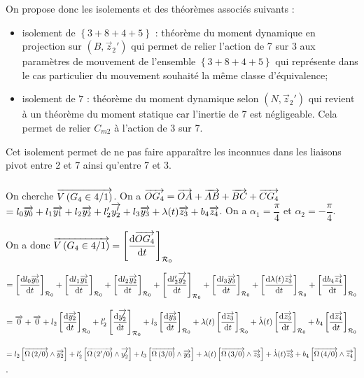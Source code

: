\documentclass[10pt,fleqn]{article} %
\begin{document}
On propose donc les isolements et des théorèmes associés suivants : 
\begin{itemize}
\item isolement de $\left\{3+8+4+5\right\}$ : théorème du moment dynamique en projection sur $\left(B,\overrightarrow{z}_2'\right)$ qui permet de relier l'action de 7 sur 3 aux paramètres de mouvement de l'ensemble $\left\{3+8+4+5\right\}$ qui représente dans le cas particulier du mouvement souhaité la même classe d'équivalence;
\item isolement de $7$ : théorème du moment dynamique selon $\left(N,\overrightarrow{z}_2'\right)$ qui revient à un théorème du moment statique car l'inertie de 7 est négligeable. Cela permet de relier $C_{m2}$ à l'action de 3 sur 7.
\end{itemize}
Cet isolement permet de ne pas faire apparaître les inconnues dans les liaisons pivot entre 2 et 7 ainsi qu'entre 7 et 3. 
\subparagraph{}%
On cherche $\overrightarrow{V\left( {G_4} \in {4}/{1}\right)}$. On a $\overrightarrow{OG_4}=\overrightarrow{OA}+\overrightarrow{AB}+\overrightarrow{BC}+\overrightarrow{CG_4}$ $=l_0\overrightarrow{y_0}+l_1\overrightarrow{y_1}+l_2\overrightarrow{y_2}+l_2'\overrightarrow{y_2'}+l_3\overrightarrow{y_3}+\lambda(t)\overrightarrow{z_3}+b_4\overrightarrow{z_4}$.
On a $\alpha_1=\dfrac{\pi}{4}$ et $\alpha_2=-\dfrac{\pi}{4}$.

On a donc $\overrightarrow{V\left( {G_4} \in {4}/{1}\right)}= \left[\dfrac{\text{d} \overrightarrow{OG_4}}{\text{d} t}\right]_{\mathcal{R}_{0}} $ 

$= 
\left[\dfrac{\text{d} l_0\overrightarrow{y_0}}{\text{d} t}\right]_{\mathcal{R}_{0}}+
\left[\dfrac{\text{d} l_1\overrightarrow{y_1}}{\text{d} t}\right]_{\mathcal{R}_{0}}+
\left[\dfrac{\text{d} l_2\overrightarrow{y_2}}{\text{d} t}\right]_{\mathcal{R}_{0}}+
\left[\dfrac{\text{d} l_2'\overrightarrow{y_2'}}{\text{d} t}\right]_{\mathcal{R}_{0}}+
\left[\dfrac{\text{d} l_3\overrightarrow{y_3}}{\text{d} t}\right]_{\mathcal{R}_{0}}+
\left[\dfrac{\text{d} \lambda(t)\overrightarrow{z_3}}{\text{d} t}\right]_{\mathcal{R}_{0}}+
\left[\dfrac{\text{d} b_4\overrightarrow{z_4}}{\text{d} t}\right]_{\mathcal{R}_{0}}$

$= 
\overrightarrow{0}+
\overrightarrow{0}+
l_2\left[\dfrac{\text{d} \overrightarrow{y_2}}{\text{d} t}\right]_{\mathcal{R}_{0}}+
l_2'\left[\dfrac{\text{d} \overrightarrow{y_2'}}{\text{d} t}\right]_{\mathcal{R}_{0}}+
l_3\left[\dfrac{\text{d} \overrightarrow{y_3}}{\text{d} t}\right]_{\mathcal{R}_{0}}+
\lambda(t)\left[\dfrac{\text{d} \overrightarrow{z_3}}{\text{d} t}\right]_{\mathcal{R}_{0}}+
\dot{\lambda}(t)\left[\dfrac{\text{d} \overrightarrow{z_3}}{\text{d} t}\right]_{\mathcal{R}_{0}}+
b_4\left[\dfrac{\text{d} \overrightarrow{z_4}}{\text{d} t}\right]_{\mathcal{R}_{0}}$

$= 
l_2\left[ \overrightarrow{\Omega\left( {2}/{0}\right)} \wedge \overrightarrow{y_2} \right]+
l_2'\left[ \overrightarrow{\Omega\left( {2'}/{0}\right)} \wedge \overrightarrow{y_2'} \right]+
l_3\left[ \overrightarrow{\Omega\left( {3}/{0}\right)} \wedge \overrightarrow{y_3} \right]+
\lambda(t)\left[ \overrightarrow{\Omega\left( {3}/{0}\right)} \wedge \overrightarrow{z_3} \right]+
\dot{\lambda}(t)\overrightarrow{z_3}+
b_4\left[ \overrightarrow{\Omega\left( {4}/{0}\right)} \wedge \overrightarrow{z_4} \right]$. 
\end{document}
